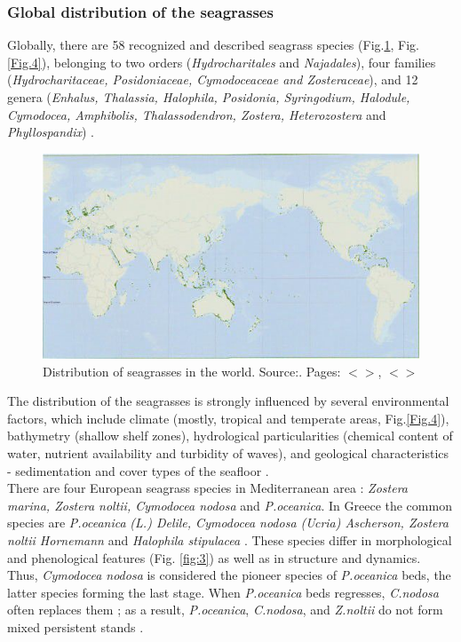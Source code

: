 \documentclass[11pt]{article}
\begin{document}
\subsubsection{Global distribution of the seagrasses}
Globally, there are 58 recognized and described seagrass species (Fig.\ref{fig:2}, Fig.\ref{Fig.4})\label{page-2}, belonging to two orders
(\textit{Hydrocharitales} and \textit{Najadales}), four families (\textit{Hydrocharitaceae, Posidoniaceae, Cymodoceaceae
and Zosteraceae}), and 12 genera (\textit{Enhalus, Thalassia, Halophila, Posidonia, Syringodium, Halodule,
Cymodocea, Amphibolis, Thalassodendron, Zostera, Heterozostera} and \textit{Phyllospandix}) \cite{Kuo89}\label{Kuo89}.

\begin{figure}
	\centering
	\includegraphics[scale=0.40]{Fig-1-2.jpg}
	\caption{Distribution of seagrasses in the world. Source:\cite{Green03}\label{Green03}. Pages: $<$\pageref{page-1}$>$, $<$\pageref{page-2}$>$}\label{fig:2}
\end{figure}

The distribution of the seagrasses is strongly influenced by several environmental factors, which
include climate (mostly, tropical and temperate areas, Fig.\ref{Fig.4}), bathymetry (shallow shelf zones), hydrological
particularities (chemical content of water, nutrient availability and turbidity of waves), and geological 
characteristics - sedimentation and cover types of the seafloor \cite{McKenzie06}\label{McKenzie06}.\\
There are four European seagrass species  in Mediterranean area \cite{Borum04}\label{Borum04}: \textit{Zostera marina,
Zostera noltii, Cymodocea nodosa} and \textit{P.oceanica}. In Greece the common species are \textit{P.oceanica}
\textit{(L.) Delile, Cymodocea nodosa (Ucria) Ascherson, Zostera noltii Hornemann} and \textit{Halophila
stipulacea} \cite{Amoutzopoulou-Schina05}\label{Amoutzopoulou-Schina05}. 
These species differ in morphological and phenological features (Fig. \ref{fig:3}) as well as in structure and dynamics. Thus, \textit{Cymodocea nodosa} is
considered the pioneer species of \textit{P.oceanica} beds, the latter species forming the last stage. When \textit{P.oceanica} beds regresses, \textit{C.nodosa} often replaces them \cite{DenHartog77}\label{DenHartog77}; as a result, \textit{P.oceanica},
\textit{C.nodosa}, and \textit{Z.noltii} do not form mixed persistent stands \cite{Buia91}\label{Buia91}.
\end{document}

